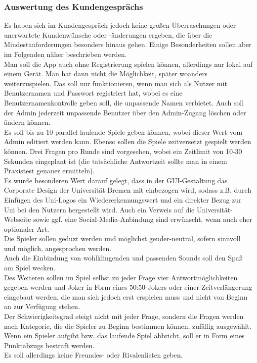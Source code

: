 \documentclass[fontsize=12pt,paper=a4,twoside]{scrartcl}
\begin{document}
\subsubsection{Auswertung des Kundengesprächs}

Es haben sich im Kundengespräch jedoch keine großen Überraschungen oder unerwartete Kundenwünsche oder -änderungen ergeben, die über die Mindestanforderungen besonders hinaus gehen. Einige Besonderheiten sollen aber im Folgenden näher beschrieben werden.\\

Man soll die App auch ohne Registrierung spielen können, allerdings nur lokal auf einem Gerät. Man hat dann nicht die Möglichkeit, später woanders weiterzuspielen. Das soll nur funktionieren, wenn man sich als Nutzer mit Benutzernamen und Passwort registriert hat, wobei es eine Benutzernamenkontrolle geben soll, die unpassende Namen verbietet. Auch soll der Admin jederzeit unpassende Benutzer über den Admin-Zugang löschen oder ändern können.\\
Es soll bis zu 10 parallel laufende Spiele geben können, wobei dieser Wert vom Admin editiert werden kann. Ebenso sollen die Spiele zeitversetzt gespielt werden können. Drei Fragen pro Runde sind vorgesehen, wobei ein Zeitlimit von 10-30 Sekunden eingeplant ist (die tatsächliche Antwortzeit sollte man in einem Praxistest genauer ermitteln).\\
Es wurde besonderen Wert darauf gelegt, dass in der GUI-Gestaltung das Corporate Design der Universität Bremen mit einbezogen wird, sodass z.B. durch Einfügen des Uni-Logos ein Wiedererkennungswert und ein direkter Bezug zur Uni bei den Nutzern hergestellt wird. Auch ein Verweis auf die Universität-Webseite sowie ggf. eine Social-Media-Anbindung sind erwünscht, wenn auch eher optionaler Art.\\
Die Spieler sollen geduzt werden und möglichst gender-neutral, sofern sinnvoll und möglich, angesprochen werden.\\
Auch die Einbindung von wohlklingenden und passenden Sounds soll den Spaß am Spiel wecken.\\
Des Weiteren sollen im Spiel selbst zu jeder Frage vier Antwortmöglichkeiten gegeben werden und Joker in Form eines 50:50-Jokers oder einer Zeitverlängerung eingebaut werden, die man sich jedoch erst erspielen muss und nicht von Beginn an zur Verfügung stehen.\\
Der Schwierigkeitsgrad steigt nicht mit jeder Frage, sondern die Fragen werden nach Kategorie, die die Spieler zu Beginn bestimmen können, zufällig ausgewählt. \\
Wenn ein Spieler aufgibt bzw. das laufende Spiel abbricht, soll er in Form eines Punktabzugs bestraft werden. \\
Es soll allerdings keine Freundes- oder Rivalenlisten geben. 
\end{document}
